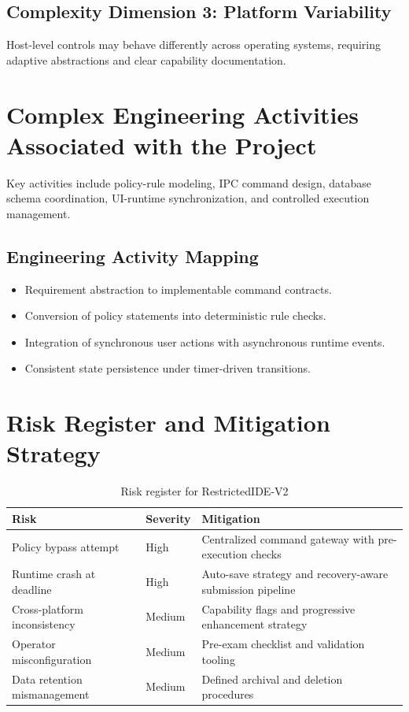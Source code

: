 \documentclass[12pt,a4paper]{report}
\begin{document}
	\subsection{Complexity Dimension 3: Platform Variability}
	Host-level controls may behave differently across operating systems, requiring adaptive abstractions and clear capability documentation.
	
	\section{Complex Engineering Activities Associated with the Project}
	Key activities include policy-rule modeling, IPC command design, database schema coordination, UI-runtime synchronization, and controlled execution management.
	
	\subsection{Engineering Activity Mapping}
	\begin{itemize}
		\item Requirement abstraction to implementable command contracts.
		\item Conversion of policy statements into deterministic rule checks.
		\item Integration of synchronous user actions with asynchronous runtime events.
		\item Consistent state persistence under timer-driven transitions.
	\end{itemize}
	
	\section{Risk Register and Mitigation Strategy}
	\begin{table}[htbp]
		\centering
		\caption{Risk register for RestrictedIDE-V2}
		\begin{tabular}{|p{}|p{}|p{}|}
			\hline
			\textbf{Risk} & \textbf{Severity} & \textbf{Mitigation} \\
			\hline
			Policy bypass attempt & High & Centralized command gateway with pre-execution checks \\
			\hline
			Runtime crash at deadline & High & Auto-save strategy and recovery-aware submission pipeline \\
			\hline
			Cross-platform inconsistency & Medium & Capability flags and progressive enhancement strategy \\
			\hline
			Operator misconfiguration & Medium & Pre-exam checklist and validation tooling \\
			\hline
			Data retention mismanagement & Medium & Defined archival and deletion procedures \\
			\hline
		\end{tabular}
	\end{table}
	
\end{document}
